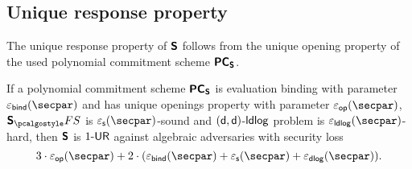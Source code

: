 \subsection{Unique response property}
The unique response property of $\bm{\mathsf{S}}$ follows from the unique opening
property of the used polynomial commitment scheme $\bm{\mathsf{PC}}_{\bm{\mathsf{S}}}$.
\begin{lemma}
\label{lem:sonicprot_ur}
If a polynomial commitment scheme $\bm{\mathsf{PC}}_{\bm{\mathsf{S}}}$ is evaluation binding with parameter
$\epsbind (\secpar)$ and has unique openings property with parameter $\epsop(\secpar)$,
$\sonicprotfs$ is $\epss (\secpar)$-sound and $(\mathsf{d}, \mathsf{d})$-$\mathsf{ldlog}$ problem is
$\epsldlog (\secpar)$-hard, then $\bm{\mathsf{S}}$ is ${1\text{-}\mathsf{UR}}$ against algebraic adversaries with security loss
  \[
    3 \cdot \epsop (\secpar) + 2 \cdot (\epsbind (\secpar) + \epss (\secpar) +
    \epsdlog (\secpar)).
  \]
\end{lemma}

